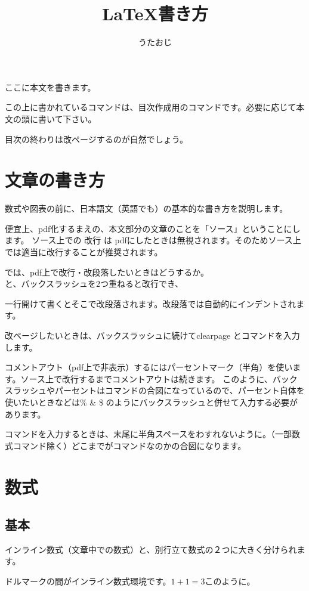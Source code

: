 \documentclass[uplatex,dvipdfmx]{jsarticle}
\numberwithin{equation}{section}
\begin{document}
\title{\LaTeX 書き方} 
\author{うたおじ}
\date{}
\maketitle
ここに本文を書きます。

\tableofcontents
\clearpage

この上に書かれているコマンドは、目次作成用のコマンドです。必要に応じて本文の頭に書いて下さい。

目次の終わりは改ページするのが自然でしょう。

\section{文章の書き方}
数式や図表の前に、日本語文（英語でも）の基本的な書き方を説明します。

便宜上、pdf化するまえの、本文部分の文章のことを「ソース」ということにします。
ソース上での
改行
は
pdfにしたときは無視されます。そのためソース上では適当に改行することが推奨されます。

では、pdf上で改行・改段落したいときはどうするか。\\と、バックスラッシュを2つ重ねると改行でき、

一行開けて書くとそこで改段落されます。改段落では自動的にインデントされます。

改ページしたいときは、バックスラッシュに続けてclearpage
\clearpage
とコマンドを入力します。

コメントアウト（pdf上で非表示）するにはパーセントマーク（半角）を使います。ソース上で改行するまでコメントアウトは続きます。%
このように、バックスラッシュやパーセントはコマンドの合図になっているので、パーセント自体を使いたいときなどは\% \& \$ のようにバックスラッシュと併せて入力する必要があります。

コマンドを入力するときは、末尾に半角スペースをわすれないように。（一部数式コマンド除く）どこまでがコマンドなのかの合図になります。

\section{数式}
\subsection{基本}
インライン数式（文章中での数式）と、別行立て数式の２つに大きく分けられます。

ドルマークの間がインライン数式環境です。$1+1=3$このように。
\end{document}
